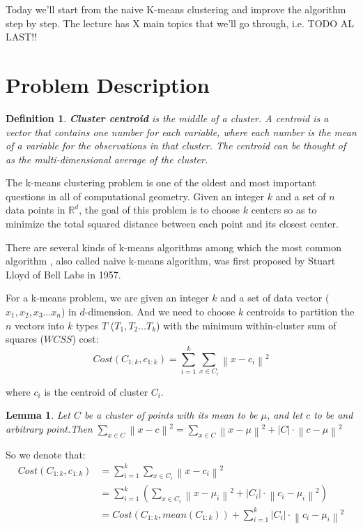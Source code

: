 \documentclass[11pt]{article}
\newtheorem{lemma}[theorem]{Lemma}
\newtheorem{definition}[theorem]{Definition}
\begin{document}
\par Today we'll start from the naive K-means clustering and improve the algorithm step by step. The lecture has X main topics that we'll go through, i.e. TODO AL LAST!!

\section{Problem Description}
\begin{definition}
\textbf{Cluster centroid} is the middle of a cluster. A centroid is a vector that contains one number for each variable, where each number is the mean of a variable for the observations in that cluster. The centroid can be thought of as the multi-dimensional average of the cluster.
\end{definition}
\par The k-means clustering problem is one of the oldest and most important questions in all of computational geometry. Given an integer $k$ and a set of $n$ data points in $\mathbb{R}^{d}$, the goal of this problem is to choose $k$ centers so as to minimize the total squared distance between each point and its closest center.\cite{kmeanspp}
\par There are several kinds of k-means algorithms among which the most common algorithm , also called naive k-means algorithm, was first proposed by Stuart Lloyd\cite{Least-squares-quantization-in-PCM} of Bell Labs in 1957.
\par For a k-means problem, we are given an integer $k$ and a set of data vector ($x_1, x_2, x_3 \dots x_n$) in $d$-dimension. And we need to choose $k$ centroids to partition the $n$ vectors into $k$ types $T$ ($T_1, T_2 \dots T_k$) with the minimum within-cluster sum of squares ($WCSS$) cost:
$$Cost(C_{1:k}, c_{1:k}) = \sum_{i=1}^{k} \sum_{x \in C_i } {\left\lVert x - c _i \right\rVert }^2  $$
\par where $c_i$ is the centroid of cluster $C_i$.

\begin{lemma}
  Let $C$ be a cluster of points with its mean to be $\mu$, and let $c$ to be and arbitrary point.Then $\sum_{x \in C}{\left\lVert x - c\right\rVert}^2 = \sum_{x \in C}{\left\lVert x - \mu\right\rVert}^2 + \left\lvert C \right\rvert \cdot {\left\lVert c - \mu\right\rVert}^2 $
\end{lemma}
\par So we denote that:
\begin{equation*}
  \begin{split}
    Cost(C_{1:k}, c_{1:k}) & = \sum_{i=1}^{k} \sum_{x \in C_i } {\left\lVert x - c _i \right\rVert }^2 \\
    & = \sum_{i=1}^{k} (\sum_{x \in C_i} {\left\lVert x - \mu_i\right\rVert}^2 + \left\lvert C_i \right\rvert \cdot {\left\lVert c_i - \mu_i\right\rVert}^2) \\
    & = Cost(C_{1:k}, mean(C_{1:k})) + \sum_{i=1}^{k} {\left\lvert C_i\right\rvert }\cdot {\left\lVert c_i - \mu_i\right\rVert }^2
  \end{split}
\end{equation*}
\end{document}
